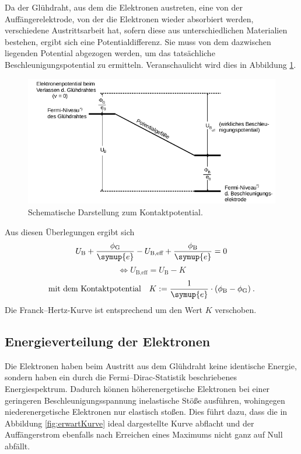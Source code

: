 Da der Glühdraht, aus dem die Elektronen austreten, eine von der Auffängerelektrode, von der die Elektronen wieder 
absorbiert werden, verschiedene Austrittsarbeit hat, sofern diese aus unterschiedlichen Materialien bestehen, ergibt 
sich eine Potentialdifferenz. Sie muss von dem dazwischen liegenden Potential abgezogen werden, um das tatsächliche 
Beschleunigungspotential zu ermitteln. 
Veranschaulicht wird dies in Abbildung \ref{fig:Kontaktpotential}.
\begin{figure}
    \centering
    \includegraphics[width=\textwidth]{plots/Kontaktpotential.png}
    \caption{Schematische Darstellung zum Kontaktpotential\cite{Versuchsanleitung}.}
    \label{fig:Kontaktpotential}
\end{figure}
Aus diesen Überlegungen ergibt sich 
\begin{equation*}
    U_\text{B}+\frac{\phi_\text{G}}{\symup{e}} -U_\text{B,eff}+\frac{\phi_\text{B}}{\symup{e}}=0
\end{equation*}
\begin{equation*}
    \Leftrightarrow U_\text{B,eff}=U_\text{B}-K
\end{equation*}
\begin{equation*}
    \text{mit dem Kontaktpotential} \quad K:=\frac{1}{\symup{e}}\cdot (\phi_\text{B}-\phi_\text{G})\:.
\end{equation*}
Die Franck--Hertz-Kurve ist entsprechend um den Wert $K$ verschoben\cite{Versuchsanleitung}. 

\subsection{Energieverteilung der Elektronen}

Die Elektronen haben beim Austritt aus dem Glühdraht keine identische Energie, sondern haben ein durch die Fermi--Dirac-Statistik 
beschriebenes Energiespektrum. 
Dadurch können höherenergetische Elektronen bei einer geringeren Beschleunigungsspannung inelastische Stöße ausführen, 
wohingegen niederenergetische Elektronen nur elastisch stoßen. Dies führt dazu, dass die in Abbildung \ref{fig:erwartKurve}
ideal dargestellte Kurve abflacht und der Auffängerstrom ebenfalls nach Erreichen eines Maximums nicht ganz auf Null abfällt. 


